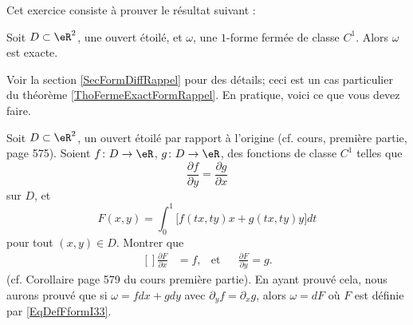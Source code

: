 

\begin{exercice}\label{exo_I-3-3}

Cet exercice consiste à prouver le résultat suivant :
\begin{theorem}
Soit $D\subset\eR^2$, une ouvert étoilé, et $\omega$, une $1$-forme fermée de classe $C^1$. Alors $\omega$ est exacte.
\end{theorem}
Voir la section \ref{SecFormDiffRappel} pour des détails; ceci est un cas particulier du théorème \ref{ThoFermeExactFormRappel}. En pratique, voici ce que vous devez faire.

Soit $D\subset\eR^2$, un ouvert étoilé par rapport à l'origine (cf. cours, première partie, page 575). Soient $f\colon D\to \eR$, $g\colon D\to \eR$, des fonctions de classe $C^1$ telles que
\begin{equation}
	\frac{ \partial f }{ \partial y }=\frac{ \partial g }{ \partial x }
\end{equation}
sur $D$, et
\begin{equation}		\label{EqDefFformI33}
	F(x,y)=\int_0^1\big[  f(tx,ty)x+g(tx,ty)y  \big]dt
\end{equation}
pour tout $(x,y)\in D$. Montrer que
\begin{equation}		\label{EqFormI33Fffdd}
	\begin{aligned}[]
		\frac{ \partial F }{ \partial x }&=f,  &\text{et}&& \frac{ \partial F }{ \partial y }=g.
	\end{aligned}
\end{equation}
(cf. Corollaire page 579 du cours première partie). En ayant prouvé cela, nous aurons prouvé que si $\omega=fdx+gdy$ avec $\partial_yf=\partial_xg$, alors $\omega=dF$ où $F$ est définie par \eqref{EqDefFformI33}.

\end{exercice}
